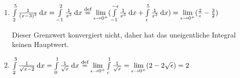 \item

\begin{enumerate}
\item $\int\limits_2^5 \frac{1}{(x-3)^2}\:\mathrm{d}{x} = \int\limits_{-1}^2 \frac{1}{x^2} \:\mathrm{d}{x} \stackrel{\text{def}}{=} \lim\limits_{\epsilon\to 0^{+}} (\int\limits_{-1}^{-\epsilon} \frac{1}{x^2} \:\mathrm{d}{x} + \int\limits_{\epsilon}^5 \frac{1}{x^2}\:\mathrm{d}{x}) = \lim\limits_{\epsilon\to 0^{+}} (\frac{2}{\epsilon} - \frac{3}{2})$

Dieser Grenzwert konvergiert nicht, daher hat das uneigentliche Integral keinen Hauptwert.

\item $\int\limits_2^3 \frac{1}{\sqrt{x-2}}\:\mathrm{d}{x} = \int\limits_0^1 \frac{1}{\sqrt{x}}\:\mathrm{d}{x} \stackrel{\text{def}}{=} \lim\limits_{\epsilon\to 0^{+}} \int\limits_\epsilon^1 \frac{1}{\sqrt{x}} = \lim\limits_{\epsilon\to 0^{+}}(2-2\sqrt{\epsilon}) = 2$
\end{enumerate}

